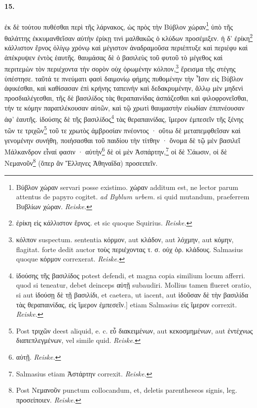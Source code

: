 \documentclass[a4paper, 11pt, oneside, polutonikogreek, german, landscape]{article}
\begin{document}
\paragraph{15.}
ἐκ δὲ τούτου πυθέσθαι περὶ τῆς λάρνακος, ὡς πρὸς τὴν Βύβλον χώραν\footnote{Βύβλον χώραν servari posse existimo. χώραν additum est, ne lector parum attentus de papyro cogitet. \emph{ad Byblum urbem.} si quid mutandum, praeferrem Βυβλίων χώραν. \emph{Reiske.}} ὑπὸ τῆς θαλάττης ἐκκυμανθεῖσαν αὐτὴν ἐρίκῃ τινὶ μαλθακῶς ὁ κλύδων προσέμιξεν. ἡ δ' ἐρίκη\footnote{ἐρίκη εἰς κάλλιστον ἔρνος. et sic quoque Squirius. \emph{Reiske.}} κάλλιστον ἔρνος ὀλίγῳ χρόνῳ καὶ μέγιστον ἀναδραμοῦσα περιέπτυξε καὶ περιέφυ καὶ ἀπέκρυψεν ἐντὸς ἑαυτῆς. θαυμάσας δὲ ὁ βασιλεὺς τοῦ φυτοῦ τὸ μέγεθος καὶ περιτεμὼν τὸν περιέχοντα τὴν σορὸν οὐχ ὁρωμένην κόλπον,\footnote{κόλπον suspectum. sententia κόρμον, aut κλάδον, aut λόχμην, aut κόμην, flagitat. forte dedit auctor τοὺς περιέχοντας τ. σ. οὐχ ὁρ. κλάδους. Salmasius quoque κόρμον correxerat. \emph{Reiske.}} ἔρεισμα τῆς στέγης ὑπέστησε. ταῦτά τε πνεύματι φασὶ δαιμονίῳ φήμης πυθομένην τὴν Ἶσιν εἰς Βύβλον ἀφικέσθαι, καὶ καθίσασαν ἐπὶ κρήνης ταπεινὴν καὶ δεδακρυμένην, ἄλλῳ μὲν μηδενὶ προσδιαλέγεσθαι, τῆς δὲ βασιλίδος τὰς θεραπαινίδας ἀσπάζεσθαι καὶ φιλοφρονεῖσθαι, τήν τε κόμην παραπλέκουσαν αὐτῶν, καὶ τῷ χρωτὶ θαυμαστὴν εὐωδίαν ἐπιπνέουσαν ἀφ' ἑαυτῆς. ἰδούσης δὲ τῆς βασιλίδος\footnote{ἰδούσης τῆς βασιλίδος potest defendi, et magna copia similium locum afferri. quod si teneatur, debet deinceps αὐτῇ subaudiri. Mollius tamen flueret oratio, si aut ἰδούσῃ δὲ τῇ βασιλίδι, et caetera, ut iacent, aut ἰδοῦσαν δὲ τὴν βασιλίδα τὰς θεραπαινίδας, εἰς ἵμερον ἐμπεσεῖν.] etiam Salmasius εἰς ἵμερον correxit. \emph{Reiske.}} τὰς θεραπαινίδας, ἵμερον ἐμπεσεῖν τῆς ξένης τῶν τε τριχῶν\footnote{Post τριχῶν deest aliquid, e. c. εὖ διακειμένων, aut κεκοσμημένων, aut ἐντέχνως διαπεπλεγμένων, vel simile quid. \emph{Reiske.}} τοῦ τε χρωτὸς ἀμβροσίαν πνέοντος · οὕτω δὲ μεταπεμφθεῖσαν καὶ γενομένην συνήθη, ποιήσασθαι τοῦ παιδίου τὴν τίτθην · ὄνομα δὲ τῷ μὲν βασιλεῖ Μάλκανδρον εἶναί φασιν · αὐτὴν\footnote{αὐτῇ. \emph{Reiske.}} δὲ οἱ μὲν Ἀσπάρτην,\footnote{Salmasius etiam Ἀστάρτην correxit. \emph{Reiske.}} οἱ δὲ Σάωσιν, οἱ δὲ Νεμανοῦν\footnote{Post Νεμανοῦν punctum collocandum, et, deletis parentheseos signis, leg. προσείποιεν. \emph{Reiske.}} (ὅπερ ἂν Ἕλληνες Ἀθηναΐδα) προσειπεῖν.
\end{document}
